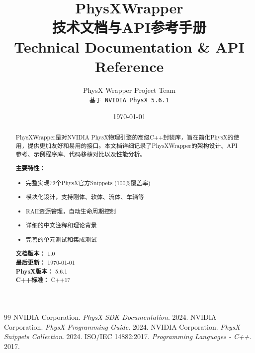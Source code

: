 \documentclass[12pt,a4paper]{report}
\title{
    \vspace{2cm}
    \Huge \textbf{PhysXWrapper} \\
    \vspace{0.5cm}
    \LARGE 技术文档与API参考手册 \\
    \vspace{0.3cm}
    \Large Technical Documentation \& API Reference \\
    \vspace{2cm}
}
\author{
    PhysX Wrapper Project Team \\
    \vspace{0.5cm}
    \texttt{基于 NVIDIA PhysX 5.6.1}
}
\date{\today}
\begin{document}
\maketitle
\thispagestyle{empty}

\newpage
\begin{abstract}
\noindent
PhysXWrapper是对NVIDIA PhysX物理引擎的高级C++封装库，旨在简化PhysX的使用，提供更加友好和易用的接口。本文档详细记录了PhysXWrapper的架构设计、API参考、示例程序库、代码移植对比以及性能分析。

\vspace{1em}
\noindent
\textbf{主要特性：}
\begin{itemize}
    \item 完整实现72个PhysX官方Snippets (100\%覆盖率)
    \item 模块化设计，支持刚体、软体、流体、车辆等
    \item RAII资源管理，自动生命周期控制
    \item 详细的中文注释和理论背景
    \item 完善的单元测试和集成测试
\end{itemize}

\vspace{1em}
\noindent
\textbf{文档版本：} 1.0 \\
\textbf{最后更新：} \today \\
\textbf{PhysX版本：} 5.6.1 \\
\textbf{C++标准：} C++17
\end{abstract}

\newpage
\tableofcontents

\newpage
\listoffigures
\listoftables

\newpage







\appendix



\begin{thebibliography}{99}
 NVIDIA Corporation. \textit{PhysX SDK Documentation}. 2024.
 NVIDIA Corporation. \textit{PhysX Programming Guide}. 2024.
 NVIDIA Corporation. \textit{PhysX Snippets Collection}. 2024.
 ISO/IEC 14882:2017. \textit{Programming Languages - C++}. 2017.
\end{thebibliography}
\end{document}
